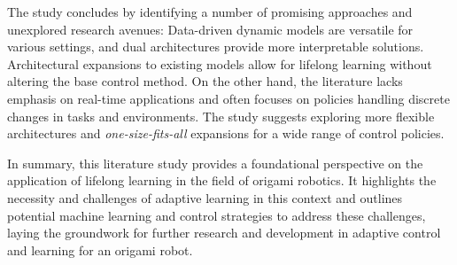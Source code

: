 The study concludes by identifying a number of promising approaches and unexplored research avenues:
Data-driven dynamic models are versatile for various settings, and dual architectures provide more interpretable solutions.
Architectural expansions to existing models allow for lifelong learning without altering the base control method.
On the other hand, the literature lacks emphasis on real-time applications and often focuses on policies handling discrete changes in tasks and environments.
The study suggests exploring more flexible architectures and \emph{one-size-fits-all} expansions for a wide range of control policies.

In summary, this literature study provides a foundational perspective on the application of lifelong learning in the field of origami robotics.
It highlights the necessity and challenges of adaptive learning in this context and outlines potential machine learning and control strategies to address these challenges, laying the groundwork for further research and development in adaptive control and learning for an origami robot.

